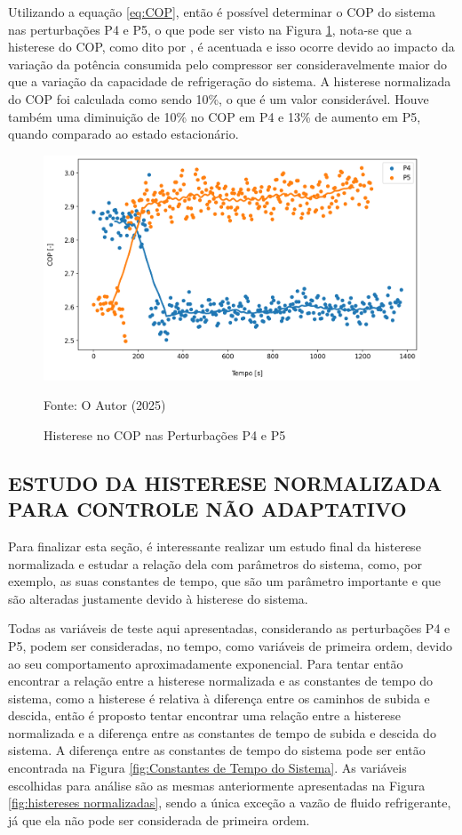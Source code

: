Utilizando a equação \ref{eq:COP}, então é possível determinar o COP do sistema nas perturbações P4 e P5, o que pode ser visto na Figura \ref{fig:Análise do COP Histerese}, nota-se que a histerese do COP, como dito por \textcite{MASCHE2021302}, é acentuada e isso ocorre devido ao impacto da variação da potência consumida pelo compressor ser consideravelmente maior do que a variação da capacidade de refrigeração do sistema. A histerese normalizada do COP foi calculada como sendo 10\%, o que é um valor considerável. Houve também uma diminuição de 10\% no COP em P4 e 13\% de aumento em P5, quando comparado ao estado estacionário.
\newpage
\begin{figure}[h]
    \centering
    \includegraphics[width=1\linewidth]{FigurasdoTexto/COP Histerese1.png}
    \caption{Histerese no COP nas Perturbações P4 e P5}
    \label{fig:Análise do COP Histerese}
    {\footnotesize Fonte: O Autor (2025)}
\end{figure}

\subsection{\MakeUppercase{Estudo da Histerese Normalizada para Controle Não Adaptativo}}

Para finalizar esta seção, é interessante realizar um estudo final da histerese normalizada e estudar a relação dela com parâmetros do sistema, como, por exemplo, as suas constantes de tempo, que são um parâmetro importante e que são alteradas justamente devido à histerese do sistema.  

Todas as variáveis de teste aqui apresentadas, considerando as perturbações P4 e P5, podem ser consideradas, no tempo, como variáveis de primeira ordem, devido ao seu comportamento aproximadamente exponencial. Para tentar então encontrar a relação entre a histerese normalizada e as constantes de tempo do sistema, como a histerese é relativa à diferença entre os caminhos de subida e descida, então é proposto tentar encontrar uma relação entre a histerese normalizada e a diferença entre as constantes de tempo de subida e descida do sistema.
\newpage
A diferença entre as constantes de tempo do sistema pode ser então encontrada na Figura \ref{fig:Constantes de Tempo do Sistema}. As variáveis escolhidas para análise são as mesmas anteriormente apresentadas na Figura \ref{fig:histereses normalizadas}, sendo a única exceção a vazão de fluido refrigerante, já que ela não pode ser considerada de primeira ordem.

